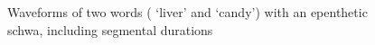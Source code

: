 \begin{figure}[t]
\caption[Waveforms of two words with an epenthetic schwa]{Waveforms of two words ( ‘liver’ and  ‘candy’) with an epenthetic schwa, including segmental durations}\label{epentheticSchwaWaveforms}
\end{figure}


%
